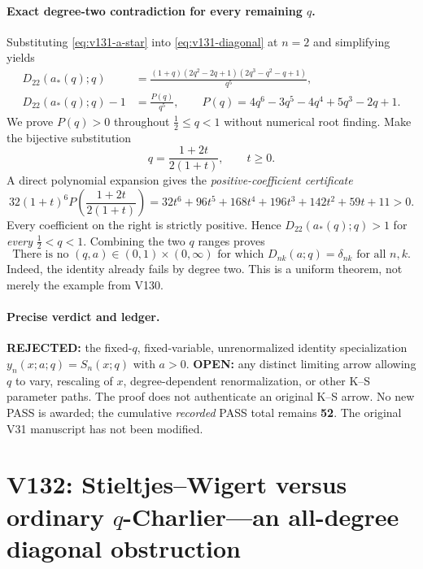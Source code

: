 \documentclass[11pt]{article}
\begin{document}
\paragraph{Exact degree-two contradiction for every remaining $q$.}
Substituting \eqref{eq:v131-a-star} into \eqref{eq:v131-diagonal} at $n=2$ and simplifying yields
\begin{align}
 D_{22}(a_*(q);q)
 &=\frac{(1+q)(2q^2-2q+1)(2q^3-q^2-q+1)}{q^5},\\
 D_{22}(a_*(q);q)-1
 &=\frac{P(q)}{q^5},\qquad
 P(q)=4q^6-3q^5-4q^4+5q^3-2q+1.
 \label{eq:v131-polynomial}
\end{align}
We prove $P(q)>0$ throughout $\tfrac12\le q<1$ without numerical root finding. Make the bijective substitution
\[
 q=\frac{1+2t}{2(1+t)},\qquad t\ge0.
\]
A direct polynomial expansion gives the \emph{positive-coefficient certificate}
\begin{equation}\label{eq:v131-positive-certificate}
 32(1+t)^6 P\!\left(\frac{1+2t}{2(1+t)}\right)
 =32t^6+96t^5+168t^4+196t^3+142t^2+59t+11>0.
\end{equation}
Every coefficient on the right is strictly positive. Hence $D_{22}(a_*(q);q)>1$ for \emph{every} $\tfrac12<q<1$. Combining the two $q$ ranges proves
\begin{equation}\label{eq:v131-impossibility}
 \boxed{\text{There is no }(q,a)\in(0,1)\times(0,\infty)
 \text{ for which }D_{nk}(a;q)=\delta_{nk}\text{ for all }n,k.}
\end{equation}
Indeed, the identity already fails by degree two. This is a uniform theorem, not merely the example from V130.

\paragraph{Precise verdict and ledger.}
\textbf{REJECTED:} the fixed-$q$, fixed-variable, unrenormalized identity specialization $y_n(x;a;q)=S_n(x;q)$ with $a>0$. \textbf{OPEN:} any distinct limiting arrow allowing $q$ to vary, rescaling of $x$, degree-dependent renormalization, or other K--S parameter paths. The proof does not authenticate an original K--S arrow. No new PASS is awarded; the cumulative \emph{recorded} PASS total remains \textbf{52}. The original V31 manuscript has not been modified.



\clearpage
\section{V132: Stieltjes--Wigert versus ordinary $q$-Charlier---an all-degree diagonal obstruction}
\label{sec:v132-SW-ordinary-qCharlier}
\end{document}
